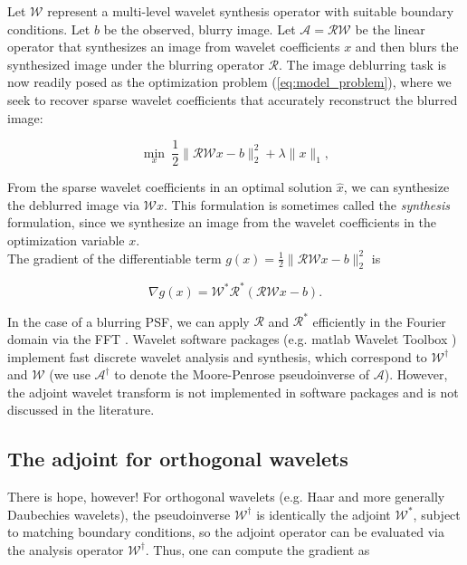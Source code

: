 \documentclass[journal]{IEEEtran}
\begin{document}
Let $\mathcal{W}$ represent a multi-level wavelet synthesis operator with suitable boundary conditions.  Let $b$ be the observed, blurry image.  Let $\mathcal{A}=\mathcal{RW}$ be the linear operator that synthesizes an image from wavelet coefficients $x$ and then blurs the synthesized image under the blurring operator $\mathcal{R}$.  The image deblurring task is now readily posed as the optimization problem (\ref{eq:model_problem}), where we seek to recover sparse wavelet coefficients that accurately reconstruct the blurred image:

\begin{equation}
\label{eq:syn_problem}
\min_x~ \dfrac{1}{2}\|\mathcal{RW}x-b\|_2^2 + \lambda \|x\|_1,
\end{equation}

\noindent From the sparse wavelet coefficients in an optimal solution $\hat{x}$, we can synthesize the deblurred image via $\mathcal{W}\hat{x}$.  This formulation is sometimes called the \emph{synthesis} formulation, since we synthesize an image from the wavelet coefficients in the optimization variable $x$.\\

The gradient of the differentiable term ${g(x)=\frac{1}{2}\|\mathcal{RW}x-b\|_2^2}$ is

\[ \nabla g(x) = \mathcal{W}^\ast \mathcal{R}^\ast(\mathcal{RW}x-b). \] 

\noindent In the case of a blurring PSF, we can apply $\mathcal{R}$ and $\mathcal{R}^\ast$ efficiently in the Fourier domain via the FFT \cite{beck_2009, hansen_2006}.  Wavelet software packages (e.g. {\sc matlab} Wavelet Toolbox \cite{matlab_wt_2015}) implement fast discrete wavelet analysis and synthesis, which correspond to $\mathcal{W}^\dagger$ and $\mathcal{W}$ (we use $\mathcal{A}^\dagger$ to denote the Moore-Penrose pseudoinverse of $\mathcal{A}$).  However, the adjoint wavelet transform is not implemented in software packages and is not discussed in the literature.\\


\subsection{The adjoint for orthogonal wavelets}
There is hope, however!  For orthogonal wavelets (e.g. Haar and more generally Daubechies wavelets), the pseudoinverse $\mathcal{W}^\dagger$ is identically the adjoint $\mathcal{W}^\ast$, subject to matching boundary conditions, so the adjoint operator can be evaluated via the analysis operator $\mathcal{W}^\dagger$.  Thus, one can compute the gradient as
\end{document}
